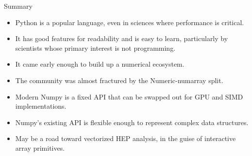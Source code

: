 \documentclass[aspectratio=169]{beamer}
\begin{document}
\begin{frame}{Summary}
\large
\vspace{0.5 cm}
\begin{itemize}\setlength{\itemsep}{0.25 cm}
\item Python is a popular language, even in sciences where performance is critical.
\item It has good features for readability and is easy to learn, particularly by scientists whose primary interest is not programming.
\item It came early enough to build up a numerical ecosystem.
\item The community was almost fractured by the Numeric-numarray split.
\item Modern Numpy is a fixed API that can be swapped out for GPU and SIMD implementations.
\item Numpy's existing API is flexible enough to represent complex data structures.
\item May be a road toward vectorized HEP analysis, in the guise of interactive array primitives.
\end{itemize}
\end{frame}
\end{document}
